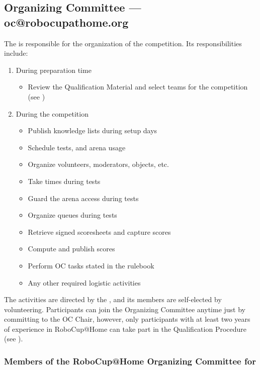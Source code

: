 %
%
\subsection{Organizing Committee --- oc@robocupathome.org}
\label{sec:oc}
The  is responsible for the organization of the competition. Its responsibilities include:

\begin{enumerate}
  \item During preparation time
  \begin{itemize}
    \item Review the Qualification Material and select teams for the competition (see )
  \end{itemize}
  \item During the competition
  \begin{itemize}
    \item Publish knowledge lists during setup days
    \item Schedule tests, and arena usage
    \item Organize volunteers, moderators, objects, etc.
    \item Take times during tests
    \item Guard the arena access during tests
    \item Organize queues during tests
    \item Retrieve signed scoresheets and capture scores
    \item Compute and publish scores
    \item Perform OC tasks stated in the rulebook
    \item Any other required logistic activities
  \end{itemize}
\end{enumerate}

The  activities are directed by the , and its members are self-elected by volunteering. Participants can join the Organizing Committee anytime just by committing to the OC Chair, however, only participants with at least two years of experience in RoboCup@Home can take part in the Qualification Procedure (see ).

\subsubsection{Members of the RoboCup@Home Organizing Committee for \YEAR}


